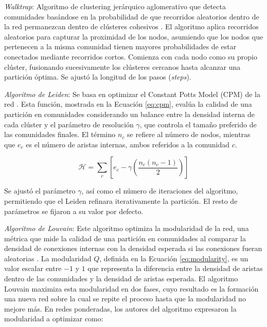 \textit{Walktrap}: Algoritmo de clustering jerárquico aglomerativo que detecta comunidades basándose en la probabilidad de que recorridos aleatorios dentro de la red permanezcan dentro de clústeres cohesivos \cite{pons2005walktrap}. El algoritmo aplica recorridos aleatorios para capturar la proximidad de los nodos, asumiendo que los nodos que pertenecen a la misma comunidad tienen mayores probabilidades de estar conectados mediante recorridos cortos. Comienza con cada nodo como su propio clúster, fusionando sucesivamente los clústeres cercanos hasta alcanzar una partición óptima. Se ajustó la longitud de los pasos (\textit{steps}).

\textit{Algoritmo de Leiden}: Se basa en optimizar el Constant Potts Model (CPM) de la red \cite{traag2019leiden,constantplottsmodel}. Esta función, mostrada en la Ecuación \ref{eq:cpm}, evalúa la calidad de una partición en comunidades considerando un balance entre la densidad interna de cada clúster y el parámetro de resolución \(\gamma\), que controla el tamaño preferido de las comunidades finales. El término \(n_c\) se refiere al número de nodos, mientras que \(e_c\) es el número de aristas internas, ambos referidos a la comunidad \(c\).

\begin{equation}
	\label{eq:cpm}
	\mathcal{H} = \sum_{c} \left[ e_c - \gamma \left( \frac{n_c (n_c - 1)}{2} \right) \right]
\end{equation}

\noindent Se ajustó el parámetro \(\gamma\), así como el número de iteraciones del algoritmo, permitiendo que el Leiden refinara iterativamente la partición. El resto de parámetros se fijaron a su valor por defecto. 


\textit{Algoritmo de Louvain}: Este algoritmo optimiza la modularidad de la red, una métrica que mide la calidad de una partición en comunidades al comparar la densidad de conexiones internas con la densidad esperada si las conexiones fueran aleatorias \cite{Blondel2008Louvain}. La modularidad \( Q \), definida en la Ecuación \ref{eq:modularity}, es un valor escalar entre \(-1\) y \(1\) que representa la diferencia entre la densidad de aristas dentro de las comunidades y la densidad de aristas esperada. El algoritmo Louvain maximiza esta modularidad en dos fases, cuyo resultado es la formación una nueva red sobre la cual se repite el proceso hasta que la modularidad no mejore más. En redes ponderadas, los autores del algoritmo expresaron la modularidad a optimizar como:

